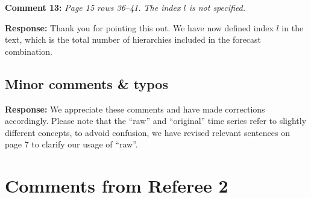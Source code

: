 \documentclass{article}
\numberwithin{equation}{section}
\theoremstyle{plain}
\theoremstyle{definition}
\theoremstyle{remark}
\begin{document}
\textbf{Comment 13:} \textit{Page 15 rows 36--41. The index $l$ is not specified.}

\medskip

\noindent \textbf{Response:} {Thank you for pointing this out. We have now defined index $l$ in the text, which is the total number of hierarchies included in the forecast combination. }

\medskip

\subsection*{Minor comments \& typos}

\begin{table}[ht]
    \centering
\end{table}

\medskip

\noindent \textbf{Response:} We appreciate these comments and have made corrections accordingly.  
{Please note that the ``raw'' and ``original'' time series refer to slightly different concepts, to advoid confusion, we have revised relevant sentences on page 7 to clarify our usage of ``raw''. }



\clearpage
\newpage

\section*{Comments from Referee 2}
\end{document}
